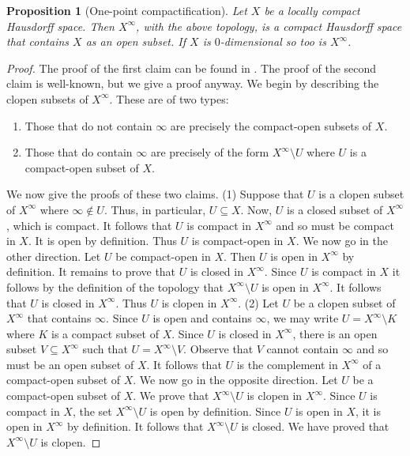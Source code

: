 \documentclass[a4paper]{amsart}
\newtheorem{proposition}[theorem]{Proposition}
\begin{document}
\begin{proposition}[One-point compactification]\label{prop:one-point-c} 
Let $X$ be a locally compact Hausdorff space.
Then $X^{\infty}$, with the above topology, is a compact Hausdorff space that contains $X$ as an open subset.
If $X$ is $0$-dimensional so too is $X^{\infty}$.
\end{proposition}
\begin{proof} The proof of the first claim can be found in \cite[Section 37]{Simmons}.
The proof of the second claim is well-known, but we give a proof anyway.
We begin by describing the clopen subsets of $X^{\infty}$.
These are of two types: 
\begin{enumerate}
\item Those that do not contain $\infty$ are precisely the compact-open subsets of $X$.
\item Those that do contain $\infty$ are precisely of the form $X^{\infty} \setminus U$ where $U$ is a compact-open 
subset of $X$.
\end{enumerate}
We now give the proofs of these two claims.
(1) Suppose that $U$ is a clopen subset of $X^{\infty}$ where $\infty \notin U$.
Thus, in particular, $U \subseteq X$.
Now, $U$ is a closed subset of $X^{\infty}$, which is compact.
It follows that $U$ is compact in $X^{\infty}$ and so must be compact in $X$.
It is open by definition.
Thus $U$ is compact-open in $X$.
We now go in the other direction.
Let $U$ be compact-open in $X$.
Then $U$ is open in $X^{\infty}$ by definition.
It remains to prove that $U$ is closed in $X^{\infty}$.
Since $U$ is compact in $X$ it follows by the definition of the topology that $X^{\infty} \setminus U$
is open in $X^{\infty}$.
It follows that $U$ is closed in $X^{\infty}$.
Thus $U$ is clopen in $X^{\infty}$.
(2) Let $U$ be a clopen subset of $X^{\infty}$ that contains $\infty$.
Since $U$ is open and contains $\infty$, we may write $U = X^{\infty} \setminus K$ where $K$ is a compact subset of $X$.
Since $U$ is closed in $X^{\infty}$, there is an open subset $V \subseteq X^{\infty}$ such that
$U = X^{\infty} \setminus V$. Observe that $V$ cannot contain $\infty$ and so must be an open subset of $X$.
It follows that $U$ is the complement in $X^{\infty}$ of a compact-open subset of $X$.
We now go in the opposite direction.
Let $U$ be a compact-open subset of $X$.
We prove that $X^{\infty} \setminus U$ is clopen in $X^{\infty}$.
Since $U$ is compact in $X$, the set $X^{\infty} \setminus U$ is open by definition.
Since $U$ is open in $X$, it is open in $X^{\infty}$ by definition.
It follows that $X^{\infty} \setminus U$ is closed.
We have proved that $X^{\infty} \setminus U$ is clopen.


\end{proof}
\end{document}
